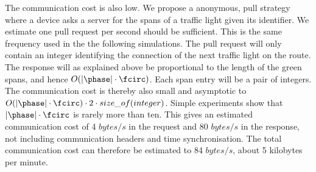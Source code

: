 The communication cost is also low.
We propose a anonymous, pull strategy where a device asks a server for the spans of a traffic light given its identifier.
We estimate one pull request per second should be sufficient.
This is the same frequency used in the the following simulations.
The pull request will only contain an integer identifying the connection of the next traffic light on the route.
The response will as explained above be proportional to the length of the green spans, and hence $O(|\phase|\cdot \fcirc)$.
Each span entry will be a pair of integers.
The communication cost is thereby also small and asymptotic to $O(|\phase|\cdot \fcirc)\cdot 2\cdot size\_of(integer)$. %
Simple experiments show that $|\phase|\cdot \fcirc$ is rarely more than ten. 
This gives an estimated communication cost of 4 $bytes/s$ in the request and 80 $bytes/s$ in the response, not including communication headers and time synchronisation.
The total communication cost can therefore be estimated to 84 $bytes/s$, about 5 kilobytes per minute.





